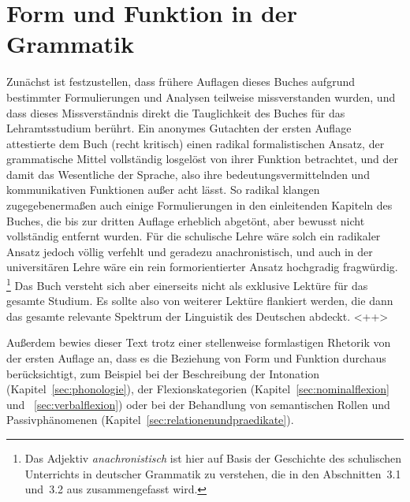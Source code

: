 \section{Form und Funktion in der Grammatik}
\label{sec:formundfunktionindergrammatik}

Zunächst ist festzustellen, dass frühere Auflagen dieses Buches aufgrund bestimmter Formulierungen und Analysen teilweise missverstanden wurden, und dass dieses Missverständnis direkt die Tauglichkeit des Buches für das Lehramtsstudium berührt.
Ein anonymes Gutachten der ersten Auflage attestierte dem Buch (recht kritisch) einen radikal formalistischen Ansatz, der grammatische Mittel vollständig losgelöst von ihrer Funktion betrachtet, und der damit das Wesentliche der Sprache, also ihre bedeutungsvermittelnden und kommunikativen Funktionen außer acht lässt.
So radikal klangen zugegebenermaßen auch einige Formulierungen in den einleitenden Kapiteln des Buches, die bis zur dritten Auflage erheblich abgetönt, aber bewusst nicht vollständig entfernt wurden.
Für die schulische Lehre wäre solch ein radikaler Ansatz jedoch völlig verfehlt und geradezu anachronistisch, und auch in der universitären Lehre wäre ein rein formorientierter Ansatz hochgradig fragwürdig.%
\footnote{Das Adjektiv \textit{anachronistisch} ist hier auf Basis der Geschichte des schulischen Unterrichts in deutscher Grammatik zu verstehen, die \zB in den Abschnitten~3.1 und~3.2 aus \citet{Bredel2013} zusammengefasst wird.}
Das Buch versteht sich aber einerseits nicht als exklusive Lektüre für das gesamte Studium.
Es sollte also von weiterer Lektüre flankiert werden, die dann das gesamte relevante Spektrum der Linguistik des Deutschen abdeckt.
<++>

Außerdem bewies dieser Text trotz einer stellenweise formlastigen Rhetorik von der ersten Auflage an, dass es die Beziehung von Form und Funktion durchaus berücksichtigt, zum Beispiel bei der Beschreibung der Intonation (Kapitel~\ref{sec:phonologie}), der Flexionskategorien (Kapitel~\ref{sec:nominalflexion} und ~\ref{sec:verbalflexion}) oder bei der Behandlung von semantischen Rollen und Passivphänomenen (Kapitel~\ref{sec:relationenundpraedikate}).

